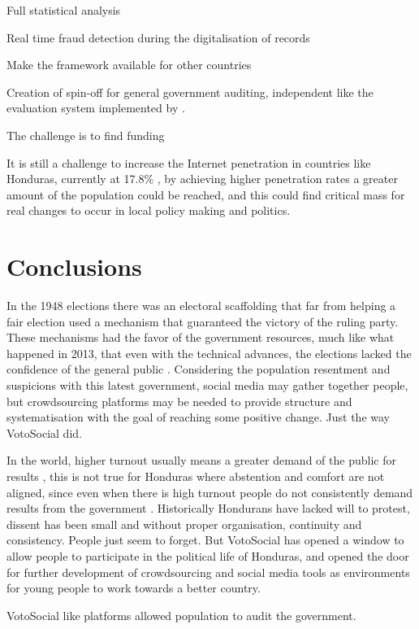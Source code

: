 \documentclass[letterpaper,10pt]{article}
\begin{document}
Full statistical analysis

Real time fraud detection during the digitalisation of records

Make the framework available for other countries

Creation of spin-off for general government auditing, independent like the evaluation system implemented by \cite{arias2014}.

The challenge is to find funding

It is still a challenge to increase the Internet penetration in countries like Honduras, currently at 17.8\% \citep{webpenet}, by achieving higher penetration rates a greater amount of the population could be reached, and this could find critical mass for real changes to occur in local policy making and politics.



\section{Conclusions}


In the 1948 elections there was an electoral scaffolding that far from helping a fair election used a mechanism that guaranteed the victory of the ruling party. These mechanisms had the favor of the government resources, much like what happened in 2013, that even with the technical advances, the elections lacked the confidence of the general public \citep{romero2014}. Considering the population resentment and suspicions with this latest government, social media may gather together people, but crowdsourcing platforms may be needed to provide structure and systematisation with the goal of reaching some positive change. Just the way VotoSocial did.


In the world, higher turnout usually means a greater demand of the public for results \citep{mac2003}, this is not true for Honduras where abstention and comfort are not aligned, since even when there is high turnout people do not consistently demand results from the government \citep{romero2014}. Historically Hondurans have lacked will to protest, dissent has been small and without proper organisation, continuity and consistency. People just seem to forget. But VotoSocial has opened a window to allow people to participate in the political life of Honduras, and opened the door for further development of crowdsourcing and social media tools as environments for young people to work towards a better country.

VotoSocial like platforms allowed population to audit the government.
\end{document}
